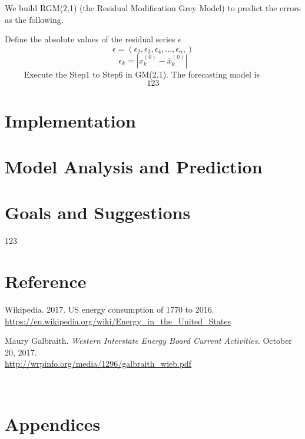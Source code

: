 \documentclass{mcmthesis}
\begin{document}
	We build RGM(2,1) (the Residual Modification Grey Model) to predict the errors as the following.

	Define the absolute values of the residual series $\epsilon$
	$$
		\epsilon = \left(\epsilon_2,\epsilon_3,\epsilon_4,...,\epsilon_n, \right)
	$$
	$$
		\epsilon_k = \left|x^{(0)}_k - \overline x^{(0)}_k \right|
	$$
	$\qquad$ Execute the Step1 to Step6 in GM(2,1). The forecasting model is
	$$
		123
	$$






\section{Implementation} \label{Sec-Implementation}

\section{Model Analysis and Prediction}

\section{Goals and Suggestions}

123 \cite{Carp}
\section{Reference}
%
\begin{thebibliography}{99}

Wikipedia. 2017. US energy consumption of 1770 to 2016.\\
\url{https://en.wikipedia.org/wiki/Energy_in_the_United_States}

Maury Galbraith. \textsl{Western Interstate Energy Board Current Activities.} October 20, 2017.\\ 
\url{http://wrpinfo.org/media/1296/galbraith_wieb.pdf}

\end{thebibliography}

\

\section{Appendices}
\end{document}
